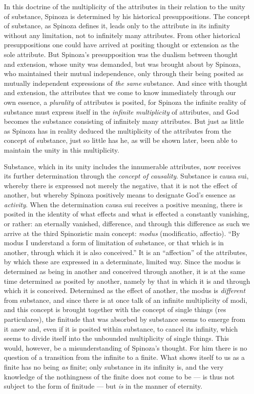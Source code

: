 In this doctrine of the multiplicity of the attributes in their relation
to the unity of substance, Spinoza is determined by his historical
presuppositions. The concept of substance, as Spinoza defines it, leads
only to the attribute in its infinity without any limitation, not to
infinitely many attributes. From other historical presuppositions one
could have arrived at positing thought or extension as the sole
attribute. But Spinoza's presupposition was the dualism between thought
and extension, whose unity was demanded, but was brought about by
Spinoza, who maintained their mutual independence, only through their
being posited as mutually independent expressions of
\emph{the same} substance. And since with thought and
extension, the attributes that we come to know immediately through our
own essence, a \emph{plurality} of attributes is posited, for Spinoza
the infinite reality of substance must express itself in the
\emph{infinite multiplicity} of attributes, and God becomes the
substance consisting of infinitely many attributes. But just as little
as Spinoza has in reality deduced the multiplicity of the attributes
from the concept of substance, just so little has he, as will be shown
later, been able to maintain the unity in this multiplicity.

Substance, which in its unity includes the innumerable attributes, now
receives its further determination through the \emph{concept of
causality}. Substance is causa sui, whereby there is expressed not
merely the negative, that it is not the effect of another, but whereby
Spinoza positively means to designate God's essence as
\emph{activity}. When the determination causa sui receives a positive
meaning, there is posited in the identity of what effects and what is
effected a constantly vanishing, or rather: an eternally vanished,
difference, and through this difference as such we arrive at the third
Spinozistic main concept: \emph{modus} (modificatio, affectio). ``By
modus I understand a form of limitation of substance, or that which is
in another, through which it is also conceived.'' It is an
``affection'' of the attributes, by which these are expressed in a
determinate, limited way. Since the modus is determined as being in
another and conceived through another, it is at the same time determined
as posited by another, namely by that in which it is and through which
it is conceived. Determined as the effect of another, the modus is
\emph{different} from substance, and since there is at once talk of an
infinite multiplicity of modi, and this concept is brought together with
the concept of single things (res particulares), the finitude that was
absorbed by substance seems to emerge from it anew and, even if it is
posited within substance, to cancel its infinity, which seems to divide
itself into the unbounded multiplicity of single things. This
would, however, be a misunderstanding of Spinoza's thought. For him
there is no question of a transition from the infinite to a finite. What
shows itself to us as a finite has no being \emph{as} finite; only
substance in its infinity is, and the very knowledge of the nothingness
of the finite does not come to be --- is thus not subject to the form of
finitude --- but \emph{is} in the manner of eternity.

